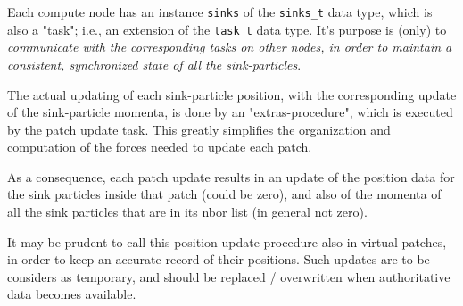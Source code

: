 \documentclass[paper=a4,fontsize=11pt]{scrartcl}
\numberwithin{equation}{section}		%
\numberwithin{figure}{section}			%
\numberwithin{table}{section}				%
\newcommand{\codecolor}{\color{Blue}}
\newcommand{\Code}[1]{{\codecolor\texttt{#1}}}
\begin{document}
Each compute node has an instance \Code{sinks} of the \Code{sinks\_t} data type, which is also a "task"; i.e., an extension of the \Code{task\_t} data type.  It's purpose is (only) to \textit{communicate with the corresponding tasks on other nodes, in order to maintain a consistent, synchronized state of all the sink-particles}.

The actual updating of each sink-particle position, with the corresponding update of the sink-particle momenta, is done by an "extras-procedure", which is executed by the patch update task. This greatly simplifies the organization and computation of the forces needed to update each patch.

As a consequence, each patch update results in an update of the position data for the sink particles inside that patch (could be zero), and also of the momenta of all the sink particles that are in its nbor list (in general not zero).

It may be prudent to call this position update procedure also in virtual patches, in order to keep an accurate record of their positions.  Such updates are to be considers as temporary, and should be replaced / overwritten when authoritative data becomes available.

\end{document}
